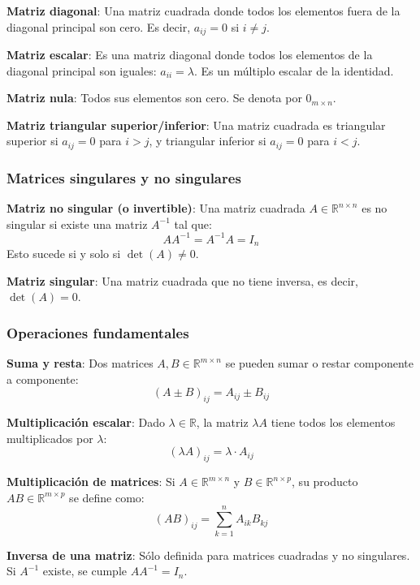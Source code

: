 \textbf{Matriz diagonal}: Una matriz cuadrada donde todos los elementos fuera de la diagonal principal son cero. Es decir, \(a_{ij} = 0\) si \(i \neq j\).

\textbf{Matriz escalar}: Es una matriz diagonal donde todos los elementos de la diagonal principal son iguales: \(a_{ii} = \lambda\). Es un múltiplo escalar de la identidad.

\textbf{Matriz nula}: Todos sus elementos son cero. Se denota por \(0_{m \times n}\).

\textbf{Matriz triangular superior/inferior}: Una matriz cuadrada es triangular superior si \(a_{ij} = 0\) para \(i > j\), y triangular inferior si \(a_{ij} = 0\) para \(i < j\).

\subsubsection{Matrices singulares y no singulares}

\textbf{Matriz no singular (o invertible)}: Una matriz cuadrada \(A \in \mathbb{R}^{n \times n}\) es no singular si existe una matriz \(A^{-1}\) tal que:
\[
AA^{-1} = A^{-1}A = I_n
\]
Esto sucede si y solo si \(\det(A) \neq 0\).

\textbf{Matriz singular}: Una matriz cuadrada que no tiene inversa, es decir, \(\det(A) = 0\).

\subsubsection{Operaciones fundamentales}

\textbf{Suma y resta}: Dos matrices \(A, B \in \mathbb{R}^{m \times n}\) se pueden sumar o restar componente a componente:
\[
(A \pm B)_{ij} = A_{ij} \pm B_{ij}
\]

\textbf{Multiplicación escalar}: Dado \(\lambda \in \mathbb{R}\), la matriz \(\lambda A\) tiene todos los elementos multiplicados por \(\lambda\):
\[
(\lambda A)_{ij} = \lambda \cdot A_{ij}
\]

\textbf{Multiplicación de matrices}: Si \(A \in \mathbb{R}^{m \times n}\) y \(B \in \mathbb{R}^{n \times p}\), su producto \(AB \in \mathbb{R}^{m \times p}\) se define como:
\[
(AB)_{ij} = \sum_{k=1}^n A_{ik} B_{kj}
\]

\textbf{Inversa de una matriz}: Sólo definida para matrices cuadradas y no singulares. Si \(A^{-1}\) existe, se cumple \(AA^{-1} = I_n\).

